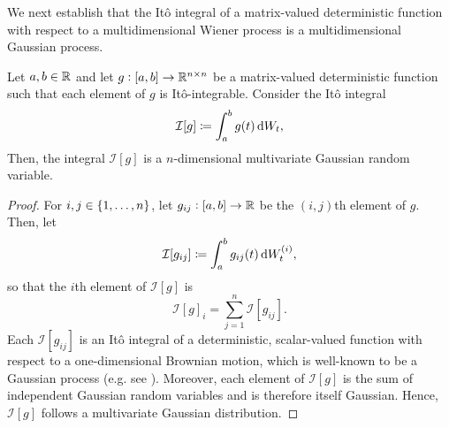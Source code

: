 We next establish that the It\^o integral of a matrix-valued deterministic function with respect to a multidimensional Wiener process is a multidimensional Gaussian process.
\begin{lemma}\label{lem:det_gauss}
	Let \(a,b \in \mathbb{R}\) and let \(g: [a,b] \to \mathbb{R}^{n\times n}\) be a matrix-valued deterministic function such that each element of \(g\) is It\^o-integrable.
	Consider the It\^o integral
	\[
		\mathcal{I}[g] \coloneqq \int_{a}^b{g(t)\dif W_t},
	\]
	Then, the integral \(\mathcal{I}[g]\) is a \(n\)-dimensional multivariate Gaussian random variable.
\end{lemma}
\begin{proof}
	For \(i,j \in \set{1,\hdots,n}\), let \(g_{ij}: [a,b] \to \mathbb{R}\) be the \((i,j)\)th element of \(g\).
	Then, let
	\[
		\mathcal{I}[g_{ij}] \coloneqq \int_a^b{g_{ij}(t)\dif W_t^{(i)}},
	\]
	so that the \(i\)th element of \(\mathcal{I}[g]\) is
	\[
		\mathcal{I}[g]_i = \sum_{j = 1}^n{\mathcal{I}\left[g_{ij}\right]}.
	\]
	Each \(\mathcal{I}[g_{ij}]\) is an It\^o integral of a deterministic, scalar-valued function with respect to a one-dimensional Brownian motion, which is well-known to be a Gaussian process (e.g. see \cite[Lem. 4.3.11]{Applebaum_2004_LevyProcessesStochastic}).
	Moreover, each element of \(\mathcal{I}[g]\) is the sum of independent Gaussian random variables and is therefore itself Gaussian.
	Hence, \(\mathcal{I}[g]\) follows a multivariate Gaussian distribution.
\end{proof}


